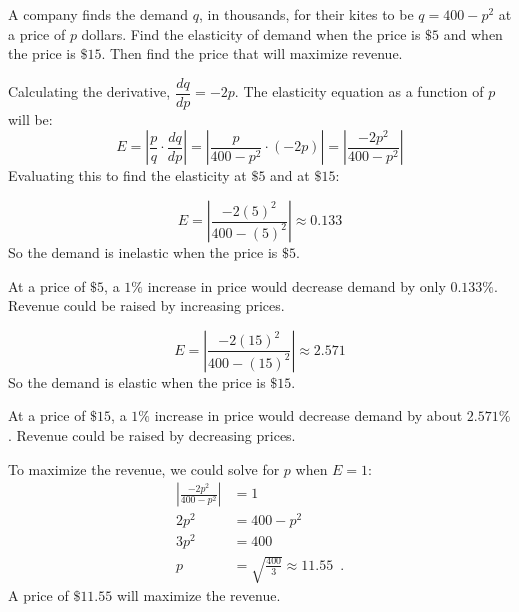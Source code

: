 \begin{example}
A company finds the demand $q$, in thousands, for their kites to be $q=400-p^2$ at a price of $p$ dollars. Find the elasticity of demand when the price is $\$5$ and when the price is $\$15$. Then find the price that will maximize revenue.

\begin{solution} Calculating the derivative, $\dfrac{dq}{dp}=-2p$. The elasticity equation as a function of $p$ will be:
$$ E=\left| \frac{p}{q}\cdot\frac{dq}{dp} \right|=\left| \frac{p}{400-p^2}\cdot (-2p) \right| =\left| \frac{-2p^2}{400-p^2} \right| $$
Evaluating this to find the elasticity at $\$5$ and at $\$15$:

$$ E = \left| \frac{-2(5)^2}{400-(5)^2} \right| \approx 0.133 $$ 
So the demand is inelastic when the price is $\$5$.

At a price of $\$5$, a $1\%$ increase in price would decrease demand by only $0.133\%$. Revenue could be raised by increasing prices.

$$ E = \left| \frac{-2(15)^2}{400-(15)^2} \right| \approx 2.571 $$
So the demand is elastic when the price is $\$15$.

At a price of $\$15$, a $1\%$ increase in price would decrease demand by about $2.571\%$. Revenue could be raised by decreasing prices.

To maximize the revenue, we could solve for $p$ when $E=1$:
\begin{align*}
		\left| \frac{-2p^2}{400-p^2} \right| &= 1 \\
		2p^2 &= 400-p^2 \\
		3p^2 &= 400 \\
		p &= \sqrt{\frac{400}{3}}\approx 11.55\enspace.
	\end{align*}
A price of $\$11.55$ will maximize the revenue.
\end{solution}\end{example}
